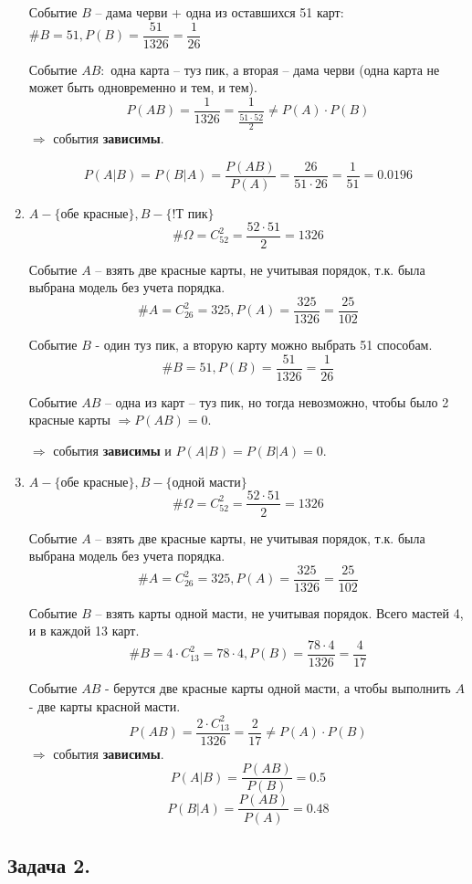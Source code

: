 \begin{enumerate}[label=\alph*)]
	Событие $B$ – дама черви + одна из оставшихся 51 карт: $\# B = 51, P(B) = \dfrac{51}{1326} = \dfrac{1}{26}$
	
	Событие $AB:$ одна карта – туз пик, а вторая – дама черви (одна карта не может быть одновременно и тем, и тем).
	\[ P(AB) = \dfrac{1}{1326} = \dfrac{1}{\frac{51 \cdot 52}{2}} \ne P(A) \cdot P(B) \]
	$\Rightarrow$ события \textbf{зависимы}.
	
	\[ P(A|B) = P(B|A) = \dfrac{P(AB)}{P(A)} = \dfrac{26}{51 \cdot 26} = \dfrac{1}{51} = 0.0196 \]
	
	
	\item $A - \{\text{обе красные}\}, B - \{!\text{Т пик}\}$
	\[ \# \Omega = C_{52}^2 = \dfrac{52 \cdot 51}{2} = 1326 \]
	
	Событие $A$ – взять две красные карты, не учитывая порядок, т.к. была выбрана модель без учета порядка.
	\[ \# A = C_{26}^2 = 325, P(A) = \dfrac{325}{1326} = \dfrac{25}{102} \]
	
	Событие $B$ - один туз пик, а вторую карту можно выбрать 51 способам.
	\[ \# B = 51, P(B) = \dfrac{51}{1326} = \dfrac{1}{26} \]
	
	Событие $AB$ – одна из карт – туз пик, но тогда невозможно, чтобы было 2 красные карты $\Rightarrow P(AB) = 0$.
	
	$\Rightarrow$ события \textbf{зависимы} и $P(A|B) = P(B|A) = 0$.
	
	\item $A - \{\text{обе красные}\}, B - \{\text{одной масти}\}$
	\[ \# \Omega = C_{52}^2 = \dfrac{52 \cdot 51}{2} = 1326 \]
	
	Событие $A$ – взять две красные карты, не учитывая порядок, т.к. была выбрана модель без учета порядка.
	\[ \# A = C_{26}^2 = 325, P(A) = \dfrac{325}{1326} = \dfrac{25}{102} \]
	
	Событие $B$ – взять карты одной масти, не учитывая порядок. Всего мастей 4, и в каждой 13 карт.
	\[ \# B = 4 \cdot C_{13}^2 = 78 \cdot 4, P(B) = \dfrac{78 \cdot 4}{1326} = \dfrac{4}{17} \]
	
	Событие $AB$ - берутся две красные карты одной масти, а чтобы выполнить $A$ - две карты красной масти.
	\[ P(AB) = \dfrac{2 \cdot C_{13}^2}{1326} = \dfrac{2}{17} \ne P(A) \cdot P(B) \]
	$\Rightarrow$ события \textbf{зависимы}.
	\[ P(A|B) = \dfrac{P(AB)}{P(B)} = 0.5 \]
	\[ P(B|A) = \dfrac{P(AB)}{P(A)} = 0.48 \]
\end{enumerate}

\subsection*{Задача 2.}

